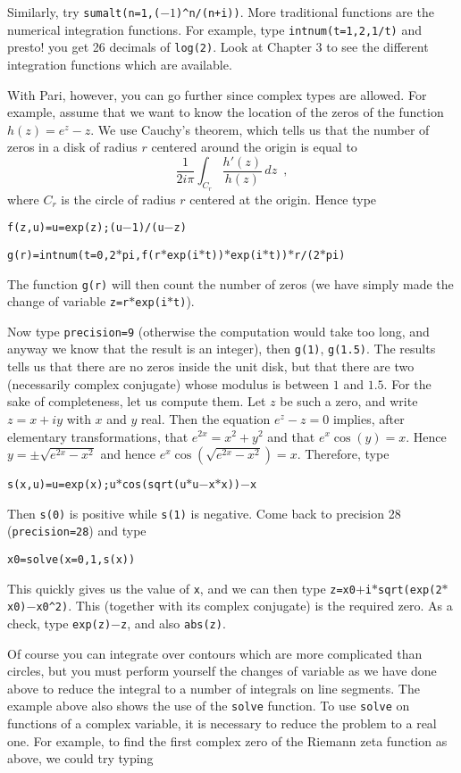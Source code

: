 Similarly, try {\tt sumalt(n=1,($-1$)\^{}n/(n+i))}.
\medskip
More traditional functions are the numerical integration functions.
For example, type {\tt intnum(t=1,2,1/t)} and presto! you get 26 decimals
of {\tt log(2)}. Look at Chapter 3 to see the different integration functions
which are available.

With Pari, however, you can go further since complex types are allowed.
For example, assume that we want to know the location of the zeros of the
function $h(z)=e^z-z$. We use Cauchy's theorem, which tells us that the
number of zeros in a disk of radius $r$ centered around the origin is
equal to
$$\dfrac{1}{2i\pi}\int_{C_r}\dfrac{h'(z)}{h(z)}\,dz\enspace,$$
where $C_r$ is the circle of radius $r$ centered at the origin.
Hence type 

\centerline{\tt f(z,u)=u=exp(z);(u$-$1)/(u$-$z)}

\centerline{\tt g(r)=intnum(t=0,2$*$pi,f(r$*$exp(i$*$t))$*$exp(i$*$t))$*$r/(2$*$pi)}

The function {\tt g(r)} will then count the number of zeros (we have simply
made the change of variable {\tt z=r$*$exp(i$*$t)}).

Now type {\tt\bs precision=9} (otherwise the computation would take too long,
and anyway we know that the result is an integer), then {\tt g(1)},
{\tt g(1.5)}. The results tells us that there are no zeros inside the unit
disk, but that there are two (necessarily complex conjugate) whose modulus
is between $1$ and $1.5$. For the sake of completeness, let us compute them.
Let $z$ be such a zero, and write $z=x+iy$ with $x$ and $y$ real. Then
the equation $e^z-z=0$ implies, after elementary transformations, that
$e^{2x}=x^2+y^2$ and that $e^x\cos(y)=x$. Hence $y=\pm\sqrt{e^{2x}-x^2}$
and hence $e^x\cos(\sqrt{e^{2x}-x^2})=x$. Therefore, type

\centerline{\tt s(x,u)=u=exp(x);u$*$cos(sqrt(u$*$u$-$x$*$x))$-$x}

Then {\tt s(0)} is positive while {\tt s(1)} is negative. Come back to
precision 28 ({\tt\bs precision=28}) and type

\centerline{\tt x0=solve(x=0,1,s(x))}

This quickly gives us the value of {\tt x}, and we can then type
{\tt z=x0$+$i$*$sqrt(exp(2$*$x0)$-$x0\^{}2)}. This (together with its complex
conjugate) is the required zero. As a check, type {\tt exp(z)$-$z}, and also
{\tt abs(z)}.

Of course you can integrate over contours which are more complicated than
circles, but you must perform yourself the changes of variable as we have
done above to reduce the integral to a number of integrals on line segments.
\smallskip
The example above also shows the use of the {\tt solve} function. To use
{\tt solve} on functions of a complex variable, it is necessary to reduce
the problem to a real one. For example, to find the first complex zero
of the Riemann zeta function as above, we could try typing

